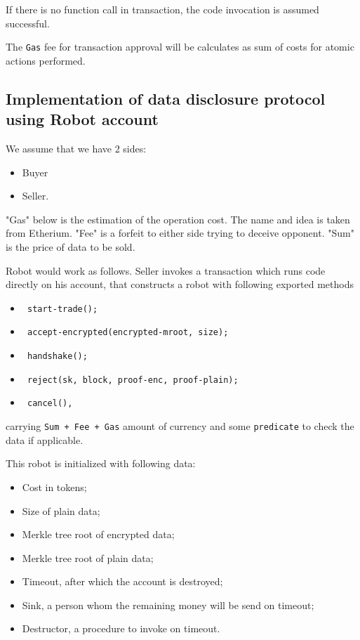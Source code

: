 If there is no function call in transaction, the code invocation is assumed successful.

The \verb|Gas| fee for transaction approval will be calculates as sum of costs for atomic actions performed.

\subsection{Implementation of data disclosure protocol using Robot account}

We assume that we have 2 sides:
\begin{itemize}
  \item Buyer
  \item Seller.
\end{itemize}

"Gas" below is the estimation of the operation cost. The name and idea is taken from Etherium.
"Fee" is a forfeit to either side trying to deceive opponent.
"Sum" is the price of data to be sold.

Robot would work as follows. Seller invokes a transaction which runs code directly on his account, that constructs a robot with following exported methods

\begin{itemize}
  \item \begin{verbatim} start-trade(); \end{verbatim}
  \item \begin{verbatim} accept-encrypted(encrypted-mroot, size); \end{verbatim}
  \item \begin{verbatim} handshake(); \end{verbatim}
  \item \begin{verbatim} reject(sk, block, proof-enc, proof-plain); \end{verbatim}
  \item \begin{verbatim} cancel(), \end{verbatim}
\end{itemize}
carrying \verb|Sum + Fee + Gas| amount of currency and some \verb|predicate| to check the data if applicable.

This robot is initialized with following data:
\begin{itemize}
  \item Cost in tokens;
  \item Size of plain data;
  \item Merkle tree root of encrypted data;
  \item Merkle tree root of plain data;
  \item Timeout, after which the account is destroyed;
  \item Sink, a person whom the remaining money will be send on timeout;
  \item Destructor, a procedure to invoke on timeout.
\end{itemize}

